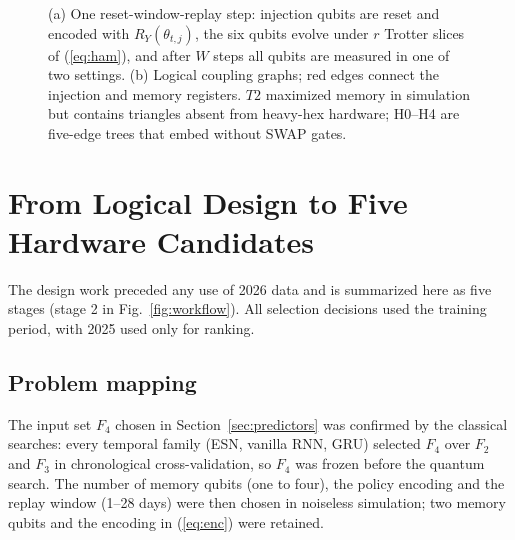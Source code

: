 \documentclass[journal]{IEEEtran}
\begin{document}
\begin{figure}[t]
{
}
\caption{(a) One reset-window-replay step: injection qubits are reset and encoded with $R_Y(\theta_{t,j})$, the six qubits evolve under $r$ Trotter slices of (\ref{eq:ham}), and after $W$ steps all qubits are measured in one of two settings. (b) Logical coupling graphs; red edges connect the injection and memory registers. $T2$ maximized memory in simulation but contains triangles absent from heavy-hex hardware; H0--H4 are five-edge trees that embed without SWAP gates.}
\label{fig:reservoir}
\end{figure}

\section{From Logical Design to Five Hardware Candidates}
The design work preceded any use of 2026 data and is summarized here as five stages (stage 2 in Fig.~\ref{fig:workflow}). All selection decisions used the training period, with 2025 used only for ranking.


\subsection{Problem mapping}
The input set $F_4$ chosen in Section~\ref{sec:predictors} was confirmed by the classical searches: every temporal family (ESN, vanilla RNN, GRU) selected $F_4$ over $F_2$ and $F_3$ in chronological cross-validation, so $F_4$ was frozen before the quantum search. The number of memory qubits (one to four), the policy encoding and the replay window (1--28 days) were then chosen in noiseless simulation; two memory qubits and the encoding in (\ref{eq:enc}) were retained.
\end{document}
